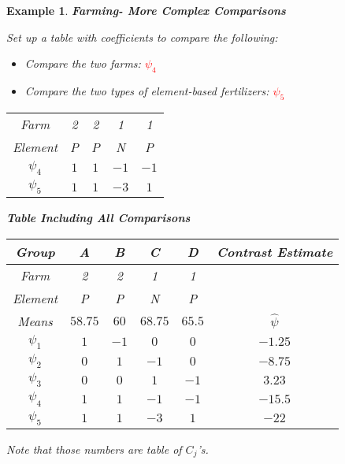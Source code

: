 \documentclass[a4paper,11pt]{article}
\newtheorem{eg}[thm]{Example}
\begin{document}
\begin{eg}
\normalfont
\textbf{Farming- More Complex Comparisons}

Set up a table with coefficients to compare the following: 
\begin{itemize}
\item Compare the two farms: \textcolor{red}{$\psi_4$}
\item Compare the two types of element-based fertilizers: \textcolor{red}{$\psi_5$}
\end{itemize}

\begin{center}
\begin{tabular}{ |c||c|c|c|c|  }
 \hline
 Farm & 2 & 2 & 1 & 1 \\
 Element & P & P & N & P\\
 \hline
 $\psi_4$   & $1$    &$1$&   $-1$ & $-1$\\
 $\psi_5$ &   $1$  & $1$   & $-3$ & $1$\\
 \hline
\end{tabular}
\end{center}

\textbf{Table Including All Comparisons}

\begin{center}
\begin{tabular}{ |c||c|c|c|c|c|  }
 \hline
 Group & A & B & C & D & Contrast Estimate\\
 \hline
 Farm & 2 & 2 & 1 & 1 & \\
 Element & P & P & N & P& \\
 Means & $58.75$ & $60$ & $68.75$ & $65.5$ & $\hat{\psi}$\\
 \hline
 $\psi_1$   & $1$    &$-1$&   $0$ & $0$ & $-1.25$\\
 $\psi_2$ &   $0$  & $1$   & $-1$ & $0$ & $-8.75$\\
 $\psi_3$ & $0$ & $0$ & $1$ & $-1$ & $3.23$\\
 $\psi_4$   & $1$    &$1$&   $-1$ & $-1$ & $-15.5$\\
 $\psi_5$ &   $1$  & $1$   & $-3$ & $1$ & $-22$\\
 \hline
\end{tabular}
\end{center}

Note that those numbers are table of $C_j$'s. 
\end{eg}
\end{document}
